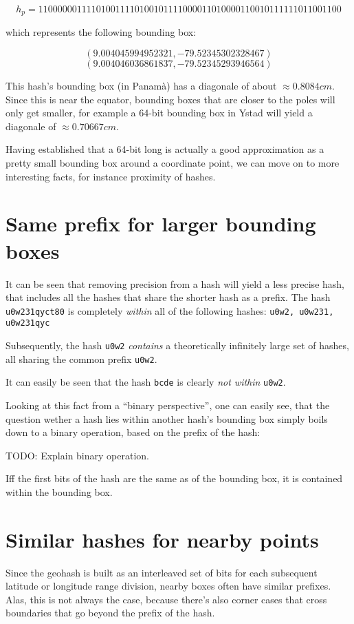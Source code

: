 \documentclass[a4paper,11pt,twoside]{scrartcl}
\begin{document}
\[
h_p = 110000001111010011110100101111000011010000110010111111011001100
\]

which represents the following bounding box:

\[
(9.004045994952321,-79.52345302328467)
\]
\[
(9.004046036861837,-79.52345293946564)
\]

This hash's bounding box (in Panamà) has a diagonale of about $\approx 0.8084 cm$. Since this is near the equator, bounding boxes that are closer to the poles will only get smaller, for example a 64-bit bounding box in Ystad will yield a diagonale of $\approx 0.70667 cm$.

Having established that a 64-bit long is actually a good approximation as a pretty small bounding box around a coordinate point, we can move on to more interesting facts, for instance proximity of hashes.


\section{Same prefix for larger bounding boxes} %
\label{sec:same_prefix_for_larger_bounding_boxes}
It can be seen that removing precision from a hash will yield a less precise hash, that includes all the hashes that share the shorter hash as a prefix.
The hash \texttt{u0w231qyct80} is completely \emph{within} all of the following hashes: \texttt{u0w2, u0w231, u0w231qyc}

Subsequently, the hash \texttt{u0w2} \emph{contains} a theoretically infinitely large set of hashes, all sharing the common prefix \texttt{u0w2}.

It can easily be seen that the hash \texttt{bcde} is clearly \emph{not within} \texttt{u0w2}.

Looking at this fact from a “binary perspective”, one can easily see, that the question wether a hash lies within another hash's bounding box simply boils down to a binary operation, based on the prefix of the hash:

TODO: Explain binary operation.

Iff the first bits of the hash are the same as of the bounding box, it is contained within the bounding box.



\section{Similar hashes for nearby points} %
\label{sec:similar_hashes_for_nearby_pojnts}
Since the geohash is built as an interleaved set of bits for each subsequent latitude or longitude range division, nearby boxes often have similar prefixes. Alas, this is not always the case, because there's also corner cases that cross boundaries that go beyond the prefix of the hash.
\end{document}
